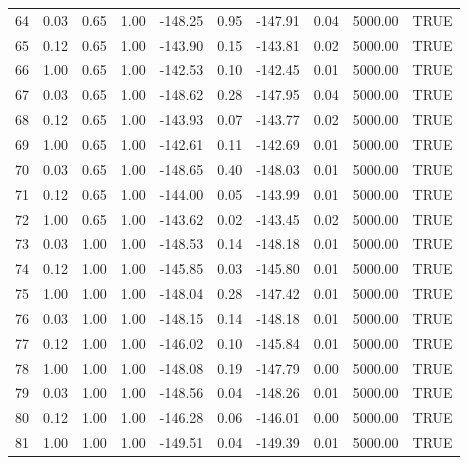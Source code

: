 \begin{table}[ht]
\begin{tabular}{rrrrrrrrrl}
  64 & 0.03 & 0.65 & 1.00 & -148.25 & 0.95 & -147.91 & 0.04 & 5000.00 & TRUE \\ 
  65 & 0.12 & 0.65 & 1.00 & -143.90 & 0.15 & -143.81 & 0.02 & 5000.00 & TRUE \\ 
  66 & 1.00 & 0.65 & 1.00 & -142.53 & 0.10 & -142.45 & 0.01 & 5000.00 & TRUE \\ 
  67 & 0.03 & 0.65 & 1.00 & -148.62 & 0.28 & -147.95 & 0.04 & 5000.00 & TRUE \\ 
  68 & 0.12 & 0.65 & 1.00 & -143.93 & 0.07 & -143.77 & 0.02 & 5000.00 & TRUE \\ 
  69 & 1.00 & 0.65 & 1.00 & -142.61 & 0.11 & -142.69 & 0.01 & 5000.00 & TRUE \\ 
  70 & 0.03 & 0.65 & 1.00 & -148.65 & 0.40 & -148.03 & 0.01 & 5000.00 & TRUE \\ 
  71 & 0.12 & 0.65 & 1.00 & -144.00 & 0.05 & -143.99 & 0.01 & 5000.00 & TRUE \\ 
  72 & 1.00 & 0.65 & 1.00 & -143.62 & 0.02 & -143.45 & 0.02 & 5000.00 & TRUE \\ 
  73 & 0.03 & 1.00 & 1.00 & -148.53 & 0.14 & -148.18 & 0.01 & 5000.00 & TRUE \\ 
  74 & 0.12 & 1.00 & 1.00 & -145.85 & 0.03 & -145.80 & 0.01 & 5000.00 & TRUE \\ 
  75 & 1.00 & 1.00 & 1.00 & -148.04 & 0.28 & -147.42 & 0.01 & 5000.00 & TRUE \\ 
  76 & 0.03 & 1.00 & 1.00 & -148.15 & 0.14 & -148.18 & 0.01 & 5000.00 & TRUE \\ 
  77 & 0.12 & 1.00 & 1.00 & -146.02 & 0.10 & -145.84 & 0.01 & 5000.00 & TRUE \\ 
  78 & 1.00 & 1.00 & 1.00 & -148.08 & 0.19 & -147.79 & 0.00 & 5000.00 & TRUE \\ 
  79 & 0.03 & 1.00 & 1.00 & -148.56 & 0.04 & -148.26 & 0.01 & 5000.00 & TRUE \\ 
  80 & 0.12 & 1.00 & 1.00 & -146.28 & 0.06 & -146.01 & 0.00 & 5000.00 & TRUE \\ 
  81 & 1.00 & 1.00 & 1.00 & -149.51 & 0.04 & -149.39 & 0.01 & 5000.00 & TRUE \\ 
   \hline
\end{tabular}
\end{table}
